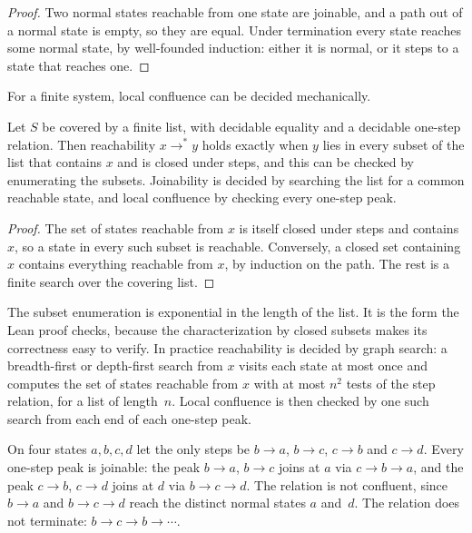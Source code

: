 \begin{proof}
Two normal states reachable from one state are joinable, and a path out of a normal state
is empty, so they are equal. Under termination every state reaches some normal state, by
well-founded induction: either it is normal, or it steps to a state that reaches one.
\end{proof}

For a finite system, local confluence can be decided mechanically.

\begin{proposition}
\label{prop:finite-peaks}
Let $S$ be covered by a finite list, with decidable equality and a decidable one-step
relation. Then reachability $x\to^{*}y$ holds exactly when $y$ lies in every subset of the
list that contains $x$ and is closed under steps, and this can be checked by enumerating
the subsets. Joinability is decided by searching the list for a common reachable state,
and local confluence by checking every one-step peak.
\end{proposition}

\begin{proof}
The set of states reachable from $x$ is itself closed under steps and contains $x$, so a
state in every such subset is reachable. Conversely, a closed set containing $x$ contains
everything reachable from $x$, by induction on the path. The rest is a finite search over
the covering list.
\end{proof}
\begin{remark}
\label{rem:graph-search}
The subset enumeration is exponential in the length of the list. It is the form the Lean
proof checks, because the characterization by closed subsets makes its correctness easy
to verify. In practice reachability is decided by graph search: a breadth-first or
depth-first search from $x$ visits each state at most once and computes the set of states
reachable from $x$ with at most $n^2$ tests of the step relation, for a list of length~$n$. Local
confluence is then checked by one such search from each end of each one-step peak.
\end{remark}

\begin{example}
\label{ex:four-state}
On four states $a,b,c,d$ let the only steps be $b\to a$, $b\to c$, $c\to b$ and
$c\to d$. Every one-step peak is joinable: the peak $b\to a$, $b\to c$ joins at $a$ via
$c\to b\to a$, and the peak $c\to b$, $c\to d$ joins at $d$ via $b\to c\to d$. The relation
is not confluent, since $b\to a$ and $b\to c\to d$ reach the distinct normal states $a$
and~$d$. The relation does not terminate: $b\to c\to b\to\cdots$.
\end{example}

